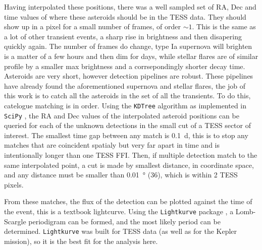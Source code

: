 \documentclass[12pt]{article}
\begin{document}
Having interpolated these positions, there was a well sampled set of RA, Dec and time values of where these asteroids should be in the TESS data.
They should show up in a pixel for a small number of frames, of order $\sim1$.
This is the same as a lot of other transient events, a sharp rise in brightness and then disapering quickly again.
The number of frames do change, type Ia supernova will brighten is a matter of a few hours and then dim for days, while stellar flares are of similar profile by a smaller max brightness and a corrsepondingly shorter decay time.
Asteroids are very short, however detection pipelines are robust.
These pipelines have already found the aforementioned supernova and stellar flares, the job of this work is to catch all the asteroids in the set of all the transients.
To do this, catelogue matching is in order.
Using the \texttt{KDTree} algorithm \citep{Maneewongvatana1999} as implemented in \texttt{SciPy} \citep{2020SciPy-NMeth} %
, the RA and Dec values of the interpolated asteroid positions can be queried for each of the unknown detections in the small cut of a TESS sector of interest. 
The smallest time gap between any match is \qty{0.1}{\day}, this is to stop any matches that are coincident spatialy but very far apart in time and is intentionally longer than one TESS FFI. 
Then, if multiple detection match to the same interpolated point, a cut is made by smallest distance, in coordinate space, and any distance must be smaller than \qty{0.01}{\degree} (\qty{36}{\arcsec}), which is within 2 TESS pixels. 


From these matches, the flux of the detection can be plotted against the time of the event, this is a textbook lightcurve. Using the \texttt{Lightkurve} package \citep{Lightkurve2018}, a Lomb-Scargle periodigram can be formed, and the most likely period can be determined. \texttt{Lightkurve} was built for TESS data (as well as for the Kepler mission), so it is the best fit for the analysis here.




\end{document}
